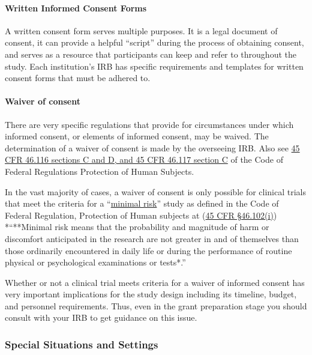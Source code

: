 \documentclass[]{book}
\begin{document}
\paragraph{Written Informed Consent
Forms}\label{written-informed-consent-forms}

A written consent form serves multiple purposes. It is a legal document
of consent, it can provide a helpful ``script'' during the process of
obtaining consent, and serves as a resource that participants can keep
and refer to throughout the study. Each institution's IRB has specific
requirements and templates for written consent forms that must be
adhered to.

\paragraph{Waiver of consent}\label{waiver-of-consent}

There are very specific regulations that provide for circumstances under
which informed consent, or elements of informed consent, may be waived.
The determination of a waiver of consent is made by the overseeing IRB.
Also see
\href{http://www.hhs.gov/ohrp/regulations-and-policy/regulations/45-cfr-46/index.html}{45
CFR 46.116 sections C and D, and 45 CFR 46.117 section C} of the Code of
Federal Regulations Protection of Human Subjects.

In the vast majority of cases, a waiver of consent is only possible for
clinical trials that meet the criteria for a
``\href{http://www.hhs.gov/ohrp/regulations-and-policy/regulations/45-cfr-46/index.html\#46.102}{minimal
risk}'' study as defined in the Code of Federal Regulation, Protection
of Human subjects at
(\href{http://www.hhs.gov/ohrp/humansubjects/guidance/45cfr46.html\#46.102}{45
CFR §46.102(i)}) *``**Minimal risk means that the probability and
magnitude of harm or discomfort anticipated in the research are not
greater in and of themselves than those ordinarily encountered in daily
life or during the performance of routine physical or psychological
examinations or tests*.''

Whether or not a clinical trial meets criteria for a waiver of informed
consent has very important implications for the study design including
its timeline, budget, and personnel requirements. Thus, even in the
grant preparation stage you should consult with your IRB to get guidance
on this issue.

\subsubsection{Special Situations and
Settings}\label{special-situations-and-settings}
\end{document}
